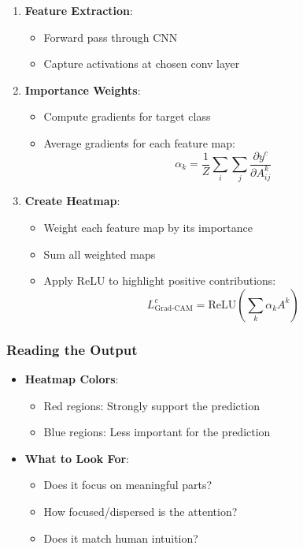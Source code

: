 \documentclass{article}
\begin{document}
\begin{enumerate}
    \item \textbf{Feature Extraction}:
        \begin{itemize}
            \item Forward pass through CNN
            \item Capture activations at chosen conv layer
        \end{itemize}
    
    \item \textbf{Importance Weights}:
        \begin{itemize}
            \item Compute gradients for target class
            \item Average gradients for each feature map:
            \begin{equation}
                \alpha_k = \frac{1}{Z} \sum_i \sum_j \frac{\partial y^c}{\partial A^k_{ij}}
            \end{equation}
        \end{itemize}
    
    \item \textbf{Create Heatmap}:
        \begin{itemize}
            \item Weight each feature map by its importance
            \item Sum all weighted maps
            \item Apply ReLU to highlight positive contributions:
            \begin{equation}
                L^c_\text{Grad-CAM} = \text{ReLU}\left(\sum_k \alpha_k A^k\right)
            \end{equation}
        \end{itemize}
\end{enumerate}

\subsubsection{Reading the Output}
\begin{itemize}
    \item \textbf{Heatmap Colors}:
        \begin{itemize}
            \item Red regions: Strongly support the prediction
            \item Blue regions: Less important for the prediction
        \end{itemize}
    \item \textbf{What to Look For}:
        \begin{itemize}
            \item Does it focus on meaningful parts?
            \item How focused/dispersed is the attention?
            \item Does it match human intuition?
        \end{itemize}
\end{itemize}
\end{document}
